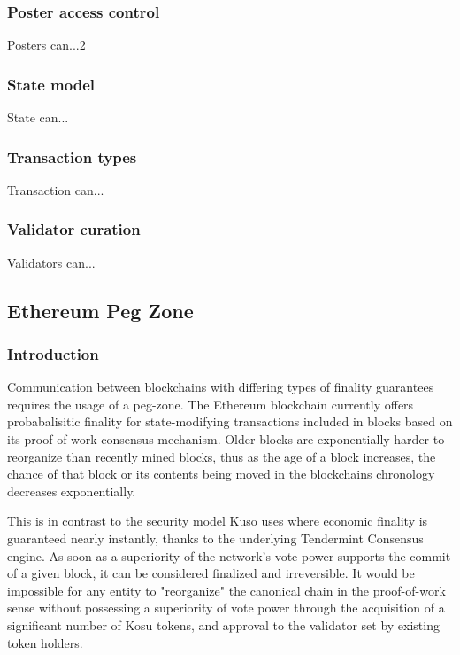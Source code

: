 \documentclass[10pt]{article}
\begin{document}
\subsubsection{Poster access control}\label{tm-network-access}
Posters can...2

\subsubsection{State model}\label{tm-network-state}
State can...

\subsubsection{Transaction types}\label{tm-network-tx-types}
Transaction can...

\subsubsection{Validator curation}\label{tm-network-validators}
Validators can...
\bigskip


\subsection{Ethereum Peg Zone}\label{peg}
\subsubsection{Introduction}\label{peg-intro}
Communication between blockchains with differing types of finality guarantees requires the usage of a peg-zone. The Ethereum blockchain currently offers probabalisitic finality for state-modifying transactions included in blocks based on its proof-of-work consensus mechanism. Older blocks are exponentially harder to reorganize\cite{blockchain-taxonomy} than recently mined blocks, thus as the age of a block increases, the chance of that block or its contents being moved in the blockchains chronology decreases exponentially.
\medskip

This is in contrast to the security model Kuso uses where economic finality is guaranteed nearly instantly, thanks to the underlying Tendermint Consensus\cite{tendermint, tendermint-wp} engine. As soon as a superiority of the network's vote power supports the commit of a given block, it can be considered finalized and irreversible. It would be impossible for any entity to "reorganize" the canonical chain in the proof-of-work sense without possessing a superiority of vote power through the acquisition of a significant number of Kosu tokens, and approval to the validator set by existing token holders.
\medskip
\end{document}

